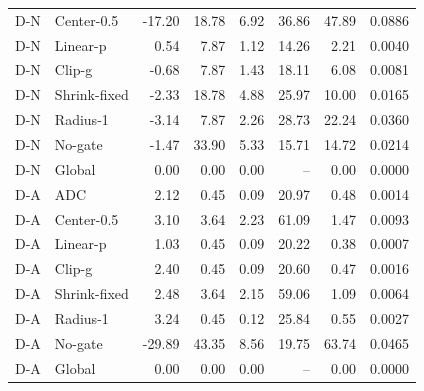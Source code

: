 \begin{table}[htbp]
\begin{tabular}{llrrrrrr}
D-N & Center-0.5 & -17.20 & 18.78 & 6.92 & 36.86 & 47.89 & 0.0886\\
D-N & Linear-p & 0.54 & 7.87 & 1.12 & 14.26 & 2.21 & 0.0040\\
D-N & Clip-g & -0.68 & 7.87 & 1.43 & 18.11 & 6.08 & 0.0081\\
D-N & Shrink-fixed & -2.33 & 18.78 & 4.88 & 25.97 & 10.00 & 0.0165\\
D-N & Radius-1 & -3.14 & 7.87 & 2.26 & 28.73 & 22.24 & 0.0360\\
D-N & No-gate & -1.47 & 33.90 & 5.33 & 15.71 & 14.72 & 0.0214\\
D-N & Global & 0.00 & 0.00 & 0.00 & -- & 0.00 & 0.0000\\
D-A & ADC & 2.12 & 0.45 & 0.09 & 20.97 & 0.48 & 0.0014\\
D-A & Center-0.5 & 3.10 & 3.64 & 2.23 & 61.09 & 1.47 & 0.0093\\
D-A & Linear-p & 1.03 & 0.45 & 0.09 & 20.22 & 0.38 & 0.0007\\
D-A & Clip-g & 2.40 & 0.45 & 0.09 & 20.60 & 0.47 & 0.0016\\
D-A & Shrink-fixed & 2.48 & 3.64 & 2.15 & 59.06 & 1.09 & 0.0064\\
D-A & Radius-1 & 3.24 & 0.45 & 0.12 & 25.84 & 0.55 & 0.0027\\
D-A & No-gate & -29.89 & 43.35 & 8.56 & 19.75 & 63.74 & 0.0465\\
D-A & Global & 0.00 & 0.00 & 0.00 & -- & 0.00 & 0.0000\\
\bottomrule
\end{tabular}
\end{table}
